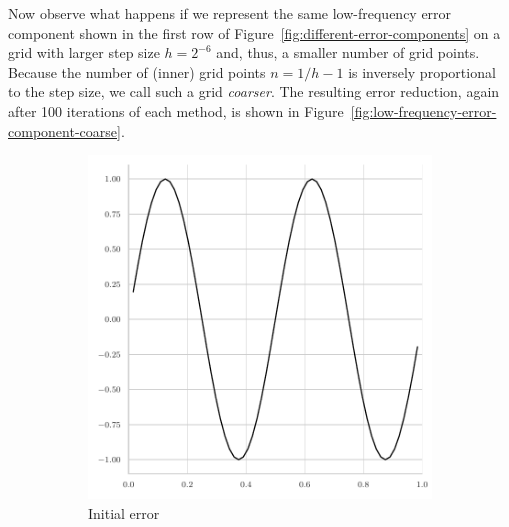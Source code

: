 Now observe what happens if we represent the same low-frequency error component shown in the first row of Figure~\ref{fig:different-error-components} on a grid with larger step size $h = 2^{-6}$ and, thus, a smaller number of grid points.
Because the number of (inner) grid points $n = 1/h - 1$ is inversely proportional to the step size, we call such a grid \emph{coarser}.
The resulting error reduction, again after 100 iterations of each method, is shown in Figure~\ref{fig:low-frequency-error-component-coarse}. 
\begin{figure}
	\begin{subfigure}[t]{0.32\textwidth}
	\centering
	\includegraphics[width=\textwidth]{figures/error_plots//initial_error_jacobi_4pi_coarse.pdf}
	\caption{Initial error}
\end{subfigure}
\hfill
\begin{subfigure}[t]{0.32\textwidth}
	\centering

\end{subfigure}
\end{figure}
